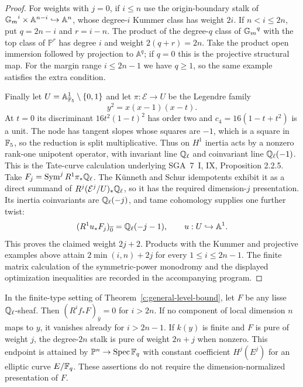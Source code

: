 \begin{proof}
For weights with $j=0$, if $i\leq n$ use the origin-boundary stalk of
${\mathbb G_m}^i\times\mathbb A^{n-i}\hookrightarrow\mathbb A^n$, whose degree-$i$ Kummer class has weight $2i$. If $n<i\leq2n$, put $q=2n-i$ and $r=i-n$. The product of the degree-$q$ class of ${\mathbb G_m}^q$ with the top class of $\mathbb P^r$ has degree $i$ and weight $2(q+r)=2n$. Take the product open immersion followed by projection to $\mathbb A^q$; if $q=0$ this is the projective structural map. For the margin range $i\leq2n-1$ we have $q\geq1$, so the same example satisfies the extra condition.

Finally let $U=\mathbb A^1_{\mathbb F_5}\setminus\{0,1\}$ and let $\pi:\mathcal E\to U$ be the Legendre family
\[
 y^2=x(x-1)(x-t).
\]
At $t=0$ its discriminant $16t^2(1-t)^2$ has order two and $c_4=16(1-t+t^2)$ is a unit. The node has tangent slopes whose squares are $-1$, which is a square in $\mathbb F_5$, so the reduction is split multiplicative. Thus on $H^1$ inertia acts by a nonzero rank-one unipotent operator, with invariant line $\mathbb Q_\ell$ and coinvariant line $\mathbb Q_\ell(-1)$. This is the Tate-curve calculation underlying SGA~7~I, IX, Proposition 2.2.5. Take $F_j=\operatorname{Sym}^j R^1\pi_*\mathbb Q_\ell$. The K\"unneth and Schur idempotents exhibit it as a direct summand of $R^j(\mathcal E^j/U)_*\mathbb Q_\ell$, so it has the required dimension-$j$ presentation. Its inertia coinvariants are $\mathbb Q_\ell(-j)$, and tame cohomology supplies one further twist:
\[
 (R^1u_*F_j)_{\overline0}=\mathbb Q_\ell(-j-1),
 \qquad u:U\hookrightarrow\mathbb A^1.
\]
This proves the claimed weight $2j+2$. Products with the Kummer and projective examples above attain $2\min(i,n)+2j$ for every $1\leq i\leq2n-1$. The finite matrix calculation of the symmetric-power monodromy and the displayed optimization inequalities are recorded in the accompanying program.
\end{proof}

\begin{proposition}
\label{c:top-direct-image}
In the finite-type setting of Theorem~\ref{c:general-level-bound}, let $F$ be any lisse $\mathbb Q_\ell$-sheaf. Then $(R^if_*F)_{\bar y}=0$ for $i>2n$. If no component of local dimension $n$ maps to $y$, it vanishes already for $i>2n-1$. If $k(y)$ is finite and $F$ is pure of weight $j$, the degree-$2n$ stalk is pure of weight $2n+j$ when nonzero. This endpoint is attained by $\mathbb P^n\to\operatorname{Spec}\mathbb F_q$ with constant coefficient $H^j(E^j)$ for an elliptic curve $E/\mathbb F_q$. These assertions do not require the dimension-normalized presentation of $F$.
\end{proposition}

